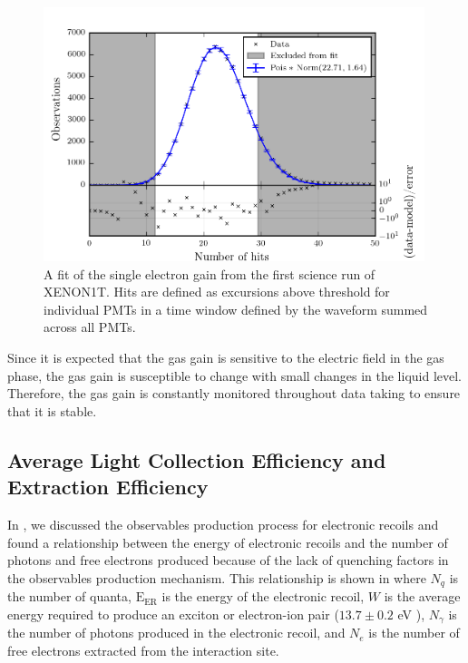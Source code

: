 \begin{figure}[t]
	\centering
	\includegraphics[width=0.99\textwidth]{xe1t_single_electron_gain}
	\caption{A fit of the single electron gain from the first science run of XENON1T.  Hits are defined as excursions above threshold for individual PMTs in a time window defined by the waveform summed across all PMTs.}
	\label{fig:xe1t_single_electron_gain}
\end{figure}


Since it is expected that the gas gain is sensitive to the electric field in the gas phase, the gas gain is susceptible to change with small changes in the liquid level.  Therefore, the gas gain is constantly monitored throughout data taking to ensure that it is stable.


\subsection{Average Light Collection Efficiency and Extraction Efficiency}
\label{sec:xe1t_anticorrelation}


In , we discussed the observables production process for electronic recoils and found a relationship between the energy of electronic recoils and the number of photons and free electrons produced because of the lack of quenching factors in the observables production mechanism.  This relationship is shown in  where $N_q$ is the number of quanta, $\textrm{E}_{\textrm{ER}}$ is the energy of the electronic recoil, $W$ is the average energy required to produce an exciton or electron-ion pair ($13.7 \pm 0.2$ eV \cite{dahl_thesis}), $N_{\gamma}$ is the number of photons produced in the electronic recoil, and $N_e$ is the number of free electrons extracted from the interaction site.

